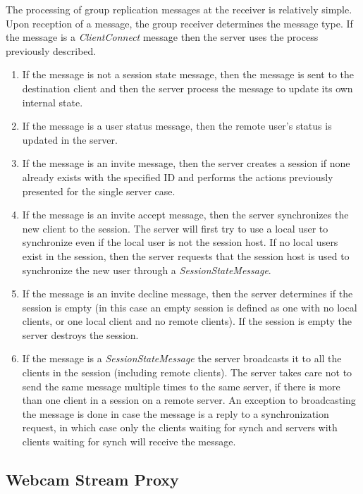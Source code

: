 The processing of group replication messages at the receiver is relatively simple. Upon reception of a message, the group receiver determines the message type. If the message is a \textit{ClientConnect} message then the server uses the process previously described. 

\begin{enumerate}
	\item If the message is not a session state message, then the message is sent to the destination client and then the server process the message to update its own internal state.
	\item If the message is a user status message, then the remote user's status is updated in the server.
	\item If the message is an invite message, then the server creates a session if none already exists with the specified ID and performs the actions previously presented for the single server case.
	\item If the message is an invite accept message, then the server synchronizes the new client to the session. The server will first try to use a local user to synchronize even if the local user is not the session host. If no local users exist in the session, then the server requests that the session host is used to synchronize the new user through a \textit{SessionStateMessage}.
	\item If the message is an invite decline message, then the server determines if the session is empty (in this case an empty session is defined as one with no local clients, or one local client and no remote clients). If the session is empty the server destroys the session.
	\item If the message is a \textit{SessionStateMessage} the server broadcasts it to all the clients in the session (including remote clients). The server takes care not to send the same message multiple times to the same server, if there is more than one client in a session on a remote server. An exception to broadcasting the message is done in case the message is a reply to a synchronization request, in which case only the clients waiting for synch and servers with clients waiting for synch will receive the message.
\end{enumerate}
 
\subsection{Webcam Stream Proxy}

